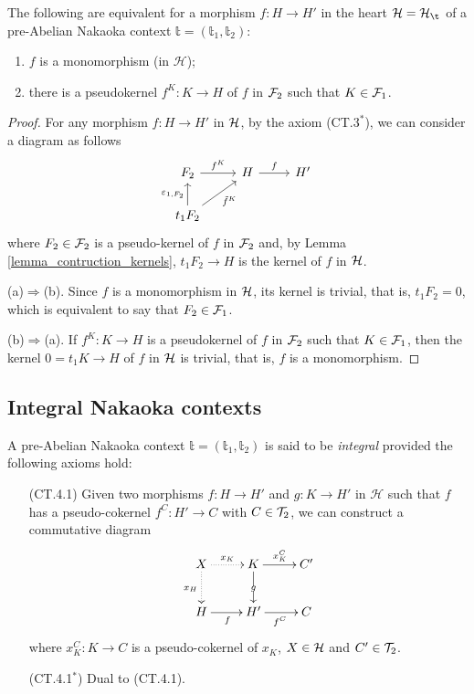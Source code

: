 \begin{prop}\label{prop:1.4}
The following are equivalent for a morphism $f\colon H\to H'$ in the heart $\H=\H_\t$ of a pre-Abelian Nakaoka context $\mathbb{t}=(\mathbb{t}_1,\mathbb{t}_2)$:
\begin{enumerate}[label=(\alph*)]
\item $f$ is a monomorphism (in $\mathcal{H}$);
\item there is a pseudokernel $f^K\colon K\to H$ of $f$ in $\mathcal F_2$ such that $K\in \mathcal F_1$. 
\end{enumerate}
\end{prop}
\begin{proof}
For any morphism $f\colon H\to H'$ in $\mathcal H$, by the axiom (CT.$3^*$), we can consider a diagram as follows
\begin{equation*}
\begin{tikzcd}
F_2\arrow{r}{f^K} & H\arrow{r}{f} & H'\\
t_1{F_2}\arrow{u}{\varepsilon_{1,F_2}}\arrow{ur}[']{\tilde{f}^K}
\end{tikzcd}
\end{equation*}
where $F_2\in \mathcal F_2$ is a pseudo-kernel of $f$ in $\mathcal F_2$ and, by Lemma \ref{lemma_contruction_kernels}, $t_1F_2\to H$ is the kernel of $f$ in $\mathcal H$.

\smallskip\noindent
(a)$\Rightarrow$(b). Since $f$ is a monomorphism in $\mathcal H$, its kernel is trivial, that is, $t_1F_2=0$, which is equivalent to say that $F_2\in \mathcal F_1$.

\smallskip\noindent
(b)$\Rightarrow$(a). If  $f^K\colon K\to H$ is a pseudokernel of $f$ in $\mathcal F_2$ such that $K\in \mathcal F_1$, then the kernel $0=t_1K\to H$ of $f$ in $\mathcal H$ is trivial, that is, $f$ is a monomorphism.
\end{proof}


\subsection{Integral Nakaoka contexts}

\begin{definition}
A pre-Abelian Nakaoka context $\mathbb{t}=(\mathbb{t}_1,\mathbb{t}_2)$ is said to be {\em integral} provided the following axioms hold:
\begin{enumerate}
\item[(CT.4.1)] Given two morphisms $f\colon H\to H'$ and $g\colon K\to H'$ in $\mathcal{H}$ such that $f$ has a pseudo-cokernel $f^C\colon H'\to C$ with $C\in \mathcal T_2$, we can construct a commutative diagram
\[
\xymatrix{
X\ar@{.>}[d]_{x_H}\ar@{.>}[r]^{x_K}&K\ar[r]^{x_K^C}\ar[d]|{g}&C'\\
H\ar[r]_f&H'\ar[r]_{f^C}&C
}
\]
where $x_K^C\colon K\to C$ is a pseudo-cokernel of $x_K$, $X\in \mathcal H$ and $C'\in \mathcal T_2$.
\item[(CT.4.1$^*$)]  Dual to (CT.4.1).
\end{enumerate}
\end{definition}

